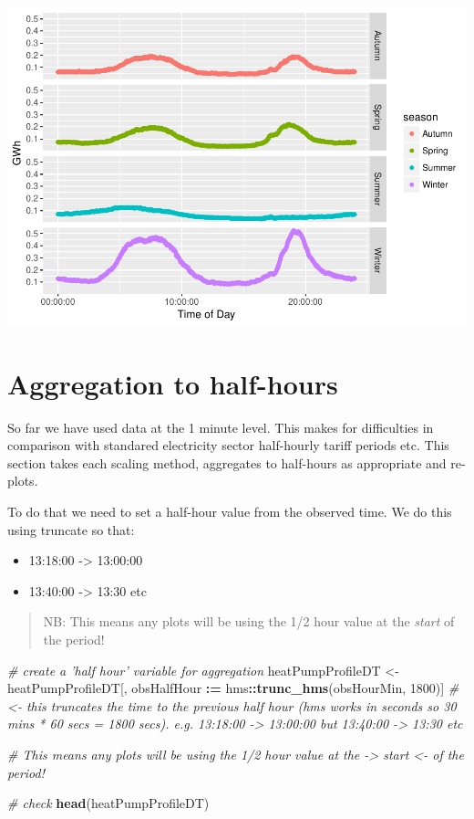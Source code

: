 \documentclass[]{article}
\newenvironment{Shaded}{\begin{snugshade}}{\end{snugshade}}
\newcommand{\KeywordTok}[1]{\textcolor[rgb]{0.13,0.29,0.53}{\textbf{#1}}}
\newcommand{\DecValTok}[1]{\textcolor[rgb]{0.00,0.00,0.81}{#1}}
\newcommand{\StringTok}[1]{\textcolor[rgb]{0.31,0.60,0.02}{#1}}
\newcommand{\CommentTok}[1]{\textcolor[rgb]{0.56,0.35,0.01}{\textit{#1}}}
\newcommand{\OperatorTok}[1]{\textcolor[rgb]{0.81,0.36,0.00}{\textbf{#1}}}
\newcommand{\ErrorTok}[1]{\textcolor[rgb]{0.64,0.00,0.00}{\textbf{#1}}}
\newcommand{\NormalTok}[1]{#1}
\providecommand{\tightlist}{%
  \setlength{\itemsep}{0pt}\setlength{\parskip}{0pt}}
\theoremstyle{definition}
\theoremstyle{definition}
\theoremstyle{definition}
\theoremstyle{remark}
\begin{document}
\includegraphics{heatPumpProfileAnalysis_files/figure-latex/new calc-1.pdf}

\section{Aggregation to half-hours}\label{aggregation-to-half-hours}

So far we have used data at the 1 minute level. This makes for
difficulties in comparison with standared electricity sector half-hourly
tariff periods etc. This section takes each scaling method, aggregates
to half-hours as appropriate and re-plots.

To do that we need to set a half-hour value from the observed time. We
do this using truncate so that:

\begin{itemize}
\tightlist
\item
  13:18:00 -\textgreater{} 13:00:00
\item
  13:40:00 -\textgreater{} 13:30 etc
\end{itemize}

\begin{quote}
NB: This means any plots will be using the 1/2 hour value at the
\emph{start} of the period!
\end{quote}

\begin{Shaded}
\begin{Highlighting}[]
\CommentTok{# create a 'half hour' variable for aggregation}
\NormalTok{heatPumpProfileDT <-}\StringTok{ }\NormalTok{heatPumpProfileDT[, obsHalfHour }\OperatorTok{:}\ErrorTok{=}\StringTok{ }\NormalTok{hms}\OperatorTok{::}\KeywordTok{trunc_hms}\NormalTok{(obsHourMin, }\DecValTok{1800}\NormalTok{)] }\CommentTok{# <- this truncates the time to the previous half hour (hms works in seconds so 30 mins * 60 secs = 1800 secs). e.g. 13:18:00 -> 13:00:00 but 13:40:00 -> 13:30 etc}

\CommentTok{# This means any plots will be using the 1/2 hour value at the  -> start <-  of the period!}

\CommentTok{# check}
\KeywordTok{head}\NormalTok{(heatPumpProfileDT)}
\end{Highlighting}
\end{Shaded}
\end{document}
